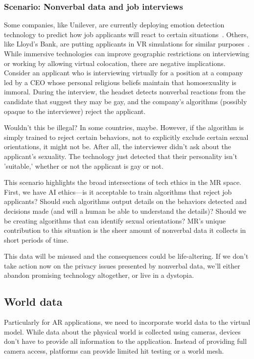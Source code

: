 \subsubsection{Scenario: Nonverbal data and job interviews}
Some companies, like Unilever, are currently deploying emotion detection technology to predict how job applicants will react to certain situations~\cite{gilliland}. Others, like Lloyd's Bank, are putting applicants in VR simulations for similar purposes~\cite{guardian2018how}. While immersive technologies can improve geographic restrictions on interviewing or working by allowing virtual colocation, there are negative implications. Consider an applicant who is interviewing virtually for a position at a company led by a CEO whose personal religious beliefs maintain that homosexuality is immoral. During the interview, the headset detects nonverbal reactions from the candidate that suggest they may be gay, and the company's algorithms (possibly opaque to the interviewer) reject the applicant.

Wouldn't this be illegal? In some countries, maybe. However, if the algorithm is simply trained to reject certain behaviors, not to explicitly exclude certain sexual orientations, it might not be. After all, the interviewer didn't ask about the applicant's sexuality. The technology just detected that their personality isn't 'suitable,' whether or not the applicant is gay or not.

This scenario highlights the broad intersections of tech ethics in the MR space. First, we have AI ethics---is it acceptable to train algorithms that reject job applicants? Should such algorithms output details on the behaviors detected and decisions made (and will a human be able to understand the details)? Should we be creating algorithms that can identify sexual orientations? MR's unique contribution to this situation is the sheer amount of nonverbal data it collects in short periods of time.

This data will be misused and the consequences could be life-altering. If we don't take action now on the privacy issues presented by nonverbal data, we'll either abandon promising technology altogether, or live in a dystopia.


\subsection{World data}

Particularly for AR applications, we need to incorporate world data to the virtual model. While data about the physical world is collected using cameras, devices don't have to provide all information to the application. Instead of providing full camera access, platforms can provide limited hit testing or a world mesh.

